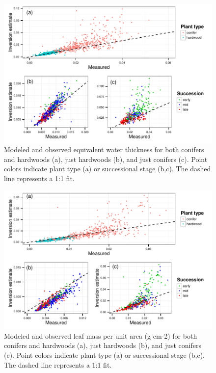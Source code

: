 {\begin{figure}[h]
  \centering
  \centerline{\includegraphics{figures/water}}
  \caption{
    Modeled and observed equivalent water thickness for both conifers and 
    hardwoods (a), just hardwoods (b), and just conifers (c). Point colors 
    indicate plant type (a) or successional stage (b,c). The dashed line 
    represents a 1:1 fit.
    }
  \label{fig:water}
\end{figure}

\begin{figure}[h]
  \centering
  \centerline{\includegraphics{figures/lma}}
  \caption{
    Modeled and observed leaf mass per unit area (g cm-2) for both conifers 
    and hardwoods (a), just hardwoods (b), and just conifers (c). Point colors 
    indicate plant type (a) or successional stage (b,c). The dashed line 
    represents a 1:1 fit.
    }
  \label{fig:lma}
\end{figure}

}
